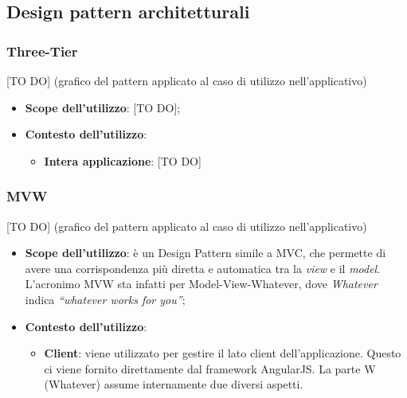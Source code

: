 %


\subsection{Design pattern architetturali} %
\label{sub:design_pattern_architetturali}
	\subsubsection{Three-Tier} %
	\label{ssub:three_tier}
	[TO DO] (grafico del pattern applicato al caso di utilizzo nell'applicativo)
		\begin{itemize}
			\item \textbf{Scope dell'utilizzo}: [TO DO];
			\item \textbf{Contesto dell'utilizzo}:
				\begin{itemize}
					\item \textbf{Intera applicazione}: [TO DO]
				\end{itemize}
		\end{itemize}


	\subsubsection{MVW} %
	\label{ssub:mvw}
	[TO DO] (grafico del pattern applicato al caso di utilizzo nell'applicativo)

		\begin{itemize}
			\item \textbf{Scope dell'utilizzo}: è un Design Pattern simile a MVC, che permette di avere una corrispondenza più diretta e automatica tra la \emph{view} e il \emph{model}. L'acronimo MVW sta infatti per Model-View-Whatever, dove \emph{Whatever} indica \emph{``whatever works for you''};
			\item \textbf{Contesto dell'utilizzo}: 
				\begin{itemize}
					\item \textbf{Client}: viene utilizzato per gestire il lato client dell'applicazione. Questo ci viene fornito direttamente dal framework AngularJS. La parte W (Whatever) assume internamente due diversi aspetti.
				\end{itemize}
		\end{itemize}

